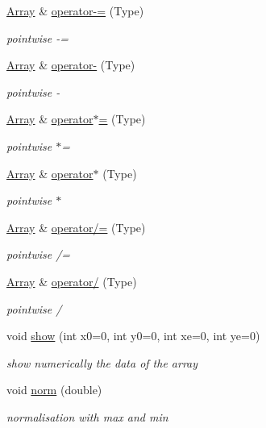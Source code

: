 \begin{DoxyCompactItemize}
\hyperlink{classArray}{Array} \& \hyperlink{classArray_ae8be026d3f586ff175b0b19a9e412caa}{operator-\/=} (Type)
\begin{DoxyCompactList}\small\item\em pointwise -\/= \end{DoxyCompactList}\item 
\hyperlink{classArray}{Array} \& \hyperlink{classArray_ab79d13b63a3c2a0a9b05d793db6e0f19}{operator-\/} (Type)
\begin{DoxyCompactList}\small\item\em pointwise -\/ \end{DoxyCompactList}\item 
\hyperlink{classArray}{Array} \& \hyperlink{classArray_a1917ff6f982774fac9e0260277cd2474}{operator$\ast$=} (Type)
\begin{DoxyCompactList}\small\item\em pointwise $\ast$= \end{DoxyCompactList}\item 
\hyperlink{classArray}{Array} \& \hyperlink{classArray_a3ae0d0caee49cb848a94ed753fa9d23f}{operator$\ast$} (Type)
\begin{DoxyCompactList}\small\item\em pointwise $\ast$ \end{DoxyCompactList}\item 
\hyperlink{classArray}{Array} \& \hyperlink{classArray_ac686fec60cb024adfab21557d214f021}{operator/=} (Type)
\begin{DoxyCompactList}\small\item\em pointwise /= \end{DoxyCompactList}\item 
\hyperlink{classArray}{Array} \& \hyperlink{classArray_a1a610f57d0269bea54602fef3c00ce93}{operator/} (Type)
\begin{DoxyCompactList}\small\item\em pointwise / \end{DoxyCompactList}\item 
void \hyperlink{classArray_a230b05e9bdd732391269ea50e8e189b7}{show} (int x0=0, int y0=0, int xe=0, int ye=0)
\begin{DoxyCompactList}\small\item\em show numerically the data of the array \end{DoxyCompactList}\item 
void \hyperlink{classArray_ab72b95e6c465232e6704b00c0bc3f981}{norm} (double)
\begin{DoxyCompactList}\small\item\em normalisation with max and min \end{DoxyCompactList}\item 

\end{DoxyCompactItemize}
